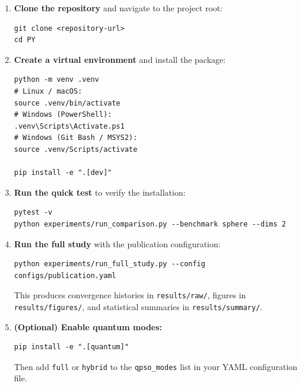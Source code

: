 \begin{enumerate}[leftmargin=*]
    \item \textbf{Clone the repository} and navigate to the project root:
    \begin{verbatim}
git clone <repository-url>
cd PY
    \end{verbatim}

    \item \textbf{Create a virtual environment} and install the package:
    \begin{verbatim}
python -m venv .venv
# Linux / macOS:
source .venv/bin/activate
# Windows (PowerShell):
.venv\Scripts\Activate.ps1
# Windows (Git Bash / MSYS2):
source .venv/Scripts/activate

pip install -e ".[dev]"
    \end{verbatim}

    \item \textbf{Run the quick test} to verify the installation:
    \begin{verbatim}
pytest -v
python experiments/run_comparison.py --benchmark sphere --dims 2
    \end{verbatim}

    \item \textbf{Run the full study} with the publication configuration:
    \begin{verbatim}
python experiments/run_full_study.py --config configs/publication.yaml
    \end{verbatim}
    This produces convergence histories in \texttt{results/raw/},
    figures in \texttt{results/figures/}, and statistical summaries
    in \texttt{results/summary/}.

    \item \textbf{(Optional) Enable quantum modes:}
    \begin{verbatim}
pip install -e ".[quantum]"
    \end{verbatim}
    Then add \texttt{full} or \texttt{hybrid} to the \texttt{qpso\_modes}
    list in your YAML configuration file.
\end{enumerate}
